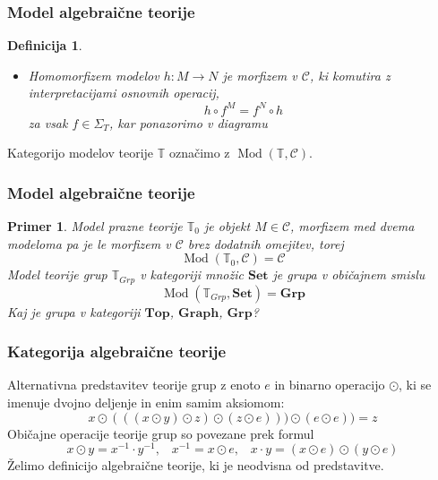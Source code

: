 \documentclass{beamer}
\DeclareMathOperator{\Mod}{Mod}
\newtheorem{definicija}{Definicija}
\newtheorem{primer}{Primer}
\begin{document}
\begin{frame}[fragile]
\frametitle{Model algebraične teorije}
\begin{definicija}
\begin{itemize}
\item \emph{Homomorfizem} modelov $h : M \to N$ je morfizem v $\mathcal{C}$, ki komutira z interpretacijami osnovnih operacij,
$$h \circ f^M = f^N \circ h$$
za vsak $f \in \Sigma_T$, kar ponazorimo v diagramu
\begin{center}
\end{center}
\end{itemize}
\end{definicija}
\pause
Kategorijo modelov teorije $\mathbb{T}$ označimo z $\Mod(\mathbb{T}, \mathcal{C})$.
\end{frame}

\begin{frame}
\frametitle{Model algebraične teorije}
\begin{primer}
Model prazne teorije $\mathbb{T}_0$ je objekt $M \in \mathcal{C}$, morfizem med dvema modeloma pa je le morfizem v $\mathcal{C}$ brez dodatnih omejitev, torej
$$\Mod(\mathbb{T}_0, \mathcal{C}) = \mathcal{C}$$
\pause
Model teorije grup $\mathbb{T}_{Grp}$ v kategoriji množic $\mathbf{Set}$ je grupa v običajnem smislu
$$\Mod(\mathbb{T}_{Grp}, \mathbf{Set}) = \mathbf{Grp}$$
\pause
Kaj je grupa v kategoriji $\mathbf{Top}$, $\mathbf{Graph}$, $\mathbf{Grp}$?
\end{primer}
\end{frame}

\begin{frame}
\frametitle{Kategorija algebraične teorije}
Alternativna predstavitev teorije grup z enoto $e$ in binarno operacijo $\odot$, ki se imenuje dvojno deljenje in enim samim aksiomom:
$$x \odot (((x \odot y ) \odot z ) \odot ( z \odot e))) \odot (e \odot e) ) = z$$
Običajne operacije teorije grup so povezane prek formul
$$x \odot y = x^{-1} \cdot y^{-1} \text{,} \quad x^{-1} = x \odot e \text{,} \quad x \cdot y = (x \odot e) \odot (y \odot e)$$
\pause
Želimo definicijo algebraične teorije, ki je neodvisna od predstavitve.
\end{frame}
\end{document}
